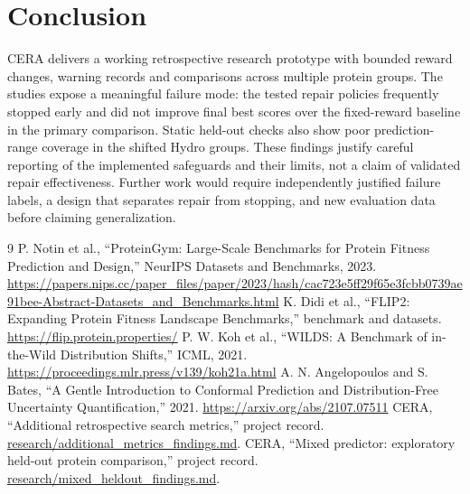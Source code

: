 \documentclass[11pt,a4paper]{article}
\begin{document}
\section{Conclusion}
CERA delivers a working retrospective research prototype with bounded reward changes, warning records and comparisons across multiple protein groups. The studies expose a meaningful failure mode: the tested repair policies frequently stopped early and did not improve final best scores over the fixed-reward baseline in the primary comparison. Static held-out checks also show poor prediction-range coverage in the shifted Hydro groups. These findings justify careful reporting of the implemented safeguards and their limits, not a claim of validated repair effectiveness. Further work would require independently justified failure labels, a design that separates repair from stopping, and new evaluation data before claiming generalization.

\begin{thebibliography}{9}
 P. Notin et al., ``ProteinGym: Large-Scale Benchmarks for Protein Fitness Prediction and Design,'' NeurIPS Datasets and Benchmarks, 2023. \url{https://papers.nips.cc/paper_files/paper/2023/hash/cac723e5ff29f65e3fcbb0739ae91bee-Abstract-Datasets_and_Benchmarks.html}
 K. Didi et al., ``FLIP2: Expanding Protein Fitness Landscape Benchmarks,'' benchmark and datasets. \url{https://flip.protein.properties/}
 P. W. Koh et al., ``WILDS: A Benchmark of in-the-Wild Distribution Shifts,'' ICML, 2021. \url{https://proceedings.mlr.press/v139/koh21a.html}
 A. N. Angelopoulos and S. Bates, ``A Gentle Introduction to Conformal Prediction and Distribution-Free Uncertainty Quantification,'' 2021. \url{https://arxiv.org/abs/2107.07511}
 CERA, ``Additional retrospective search metrics,'' project record. \href{../../research/additional_metrics_findings.md}{research/additional\_metrics\_findings.md}.
 CERA, ``Mixed predictor: exploratory held-out protein comparison,'' project record. \href{../../research/mixed_heldout_findings.md}{research/mixed\_heldout\_findings.md}.
\end{thebibliography}
\end{document}
